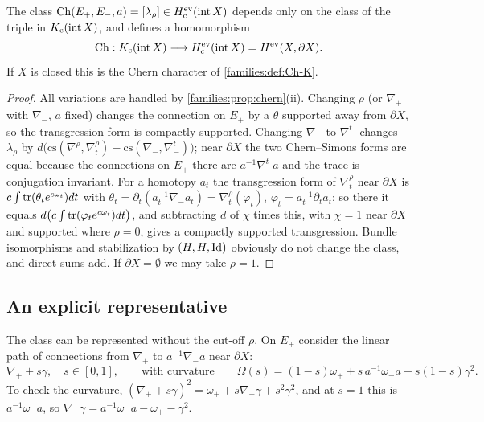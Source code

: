 \begin{proposition}\label{families:prop:relative-chern}
  The class $\operatorname{Ch}(E_+,E_-,a)=[\lambda_\rho]\in H^{\mathrm{ev}}_{\mathrm c}
  (\operatorname{int}X)$ depends only on the class of the triple in
  $K_{\mathrm{c}}(\operatorname{int}X)$, and defines a homomorphism
  \begin{equation*}
    \operatorname{Ch}:K_{\mathrm{c}}(\operatorname{int}X)\longrightarrow H^{\mathrm{ev}}_{\mathrm c}
    (\operatorname{int}X)=H^{\mathrm{ev}}(X,\partial X).
  \end{equation*}
  If $X$ is closed this is the Chern character of \cref{families:def:Ch-K}.
\end{proposition}
\begin{proof}
  All variations are handled by \cref{families:prop:chern}(ii). Changing
  $\rho$ (or $\nabla_+$ with $\nabla_-$, $a$ fixed) changes the connection on
  $E_+$ by a $\theta$ supported away from $\partial X$, so the transgression
  form is compactly supported. Changing $\nabla_-$ to $\nabla_-^t$ changes
  $\lambda_\rho$ by
  $d\bigl(\mathrm{cs}(\nabla^\rho,\nabla^{\rho}_t)-\mathrm{cs}(\nabla_-,
  \nabla_-^t)\bigr)$; near $\partial X$ the two Chern--Simons forms are
  equal because the connections on $E_+$ there are $a^{-1}\nabla_-^ta$ and
  the trace is conjugation invariant. For a homotopy $a_t$ the transgression
  form of $\nabla^\rho_t$ near $\partial X$ is
  $c\int\operatorname{tr}(\theta_te^{c\omega_t})dt$ with $\theta_t=\partial_t(a_t^{-1}\nabla_-
  a_t)=\nabla^\rho_t(\varphi_t)$, $\varphi_t=a_t^{-1}\partial_ta_t$; so there it
  equals $d\bigl(c\int\operatorname{tr}(\varphi_te^{c\omega_t})dt\bigr)$, and subtracting
  $d$ of $\chi$ times this, with $\chi=1$ near $\partial X$ and supported
  where $\rho=0$, gives a compactly supported transgression. Bundle
  isomorphisms and stabilization by $(H,H,\operatorname{Id})$ obviously do not change the
  class, and direct sums add. If $\partial X=\emptyset$ we may take $\rho=1$.
\end{proof}

\subsection{An explicit representative}
The class can be represented without the cut-off $\rho$. On $E_+$ consider the
linear path of connections from $\nabla_+$ to $a^{-1}\nabla_-a$ near
$\partial X$:
\begin{equation*}
  \nabla_+ +s\gamma,\quad s\in[0,1],\qquad\text{with curvature}\qquad
  \Omega(s)=(1-s)\omega_++s\,a^{-1}\omega_-a-s(1-s)\gamma^2.
\end{equation*}
To check the curvature, $(\nabla_++s\gamma)^2=\omega_++s\nabla_+\gamma+
s^2\gamma^2$, and at $s=1$ this is $a^{-1}\omega_-a$, so
$\nabla_+\gamma=a^{-1}\omega_-a-\omega_+-\gamma^2$.

